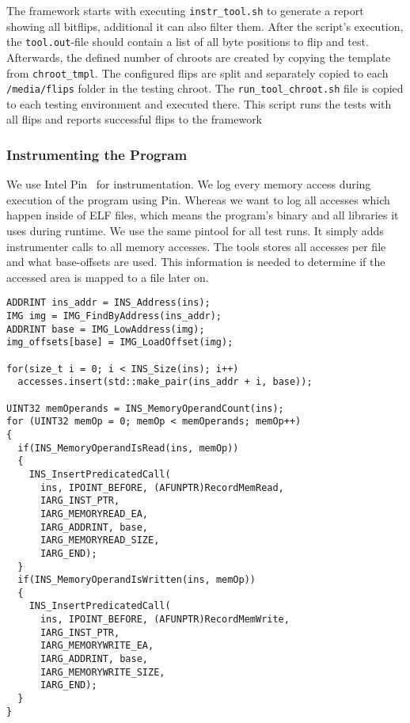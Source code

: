 The framework starts with executing \texttt{instr\_tool.sh} to generate a report
showing all bitflips, additional it can also filter them. After the script's
execution, the \texttt{tool.out}-file should contain a list of all byte
positions to flip and test. Afterwards, the defined number of chroots are
created by copying the template from \texttt{chroot\_tmpl}. The configured flips
are split and separately copied to each \texttt{/media/flips} folder in the
testing chroot. The \texttt{run\_tool\_chroot.sh} file is copied to each testing
environment and executed there. This script runs the tests with all flips and
reports successful flips to the framework

\subsubsection{Instrumenting the Program}

We use Intel Pin~\cite{pintool} for instrumentation.  We log every memory access
during execution of the program using Pin. Whereas we want to log all accesses
which happen inside of ELF files, which means the program's binary and all
libraries it uses during runtime. We use the same pintool for all test runs. It
simply adds instrumenter calls to all memory accesses. The tools stores all
accesses per file and what base-offsets are used. This information is needed to
determine if the accessed area is mapped to a file later on.

\begin{minipage}{\linewidth}
\begin{lstlisting}[style=CStyle,
                   caption={Example C++ code for a pintool logging memory
accesses. At first, the tool stores the instruction bytes, and after the
operands are stored separately, depending on if they are writing or reading
memory.},
                   label={lst:pinlogcode}]
ADDRINT ins_addr = INS_Address(ins);
IMG img = IMG_FindByAddress(ins_addr);
ADDRINT base = IMG_LowAddress(img);
img_offsets[base] = IMG_LoadOffset(img);

for(size_t i = 0; i < INS_Size(ins); i++)
  accesses.insert(std::make_pair(ins_addr + i, base));

UINT32 memOperands = INS_MemoryOperandCount(ins);
for (UINT32 memOp = 0; memOp < memOperands; memOp++)
{
  if(INS_MemoryOperandIsRead(ins, memOp))
  {
    INS_InsertPredicatedCall(
      ins, IPOINT_BEFORE, (AFUNPTR)RecordMemRead,
      IARG_INST_PTR,
      IARG_MEMORYREAD_EA,
      IARG_ADDRINT, base,
      IARG_MEMORYREAD_SIZE,
      IARG_END);
  }
  if(INS_MemoryOperandIsWritten(ins, memOp))
  {
    INS_InsertPredicatedCall(
      ins, IPOINT_BEFORE, (AFUNPTR)RecordMemWrite,
      IARG_INST_PTR,
      IARG_MEMORYWRITE_EA,
      IARG_ADDRINT, base,
      IARG_MEMORYWRITE_SIZE,
      IARG_END);
  }
}
\end{lstlisting}
\end{minipage}

